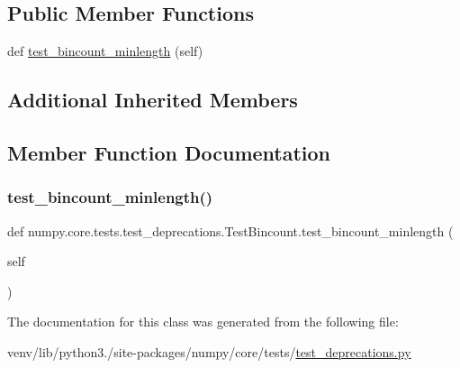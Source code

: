 \subsection*{Public Member Functions}
\begin{DoxyCompactItemize}
\item 
def \hyperlink{classnumpy_1_1core_1_1tests_1_1test__deprecations_1_1TestBincount_a8cfee9588e6784ca48a94bbd00c7c5a6}{test\+\_\+bincount\+\_\+minlength} (self)
\end{DoxyCompactItemize}
\subsection*{Additional Inherited Members}


\subsection{Member Function Documentation}
\mbox{\label{classnumpy_1_1core_1_1tests_1_1test__deprecations_1_1TestBincount_a8cfee9588e6784ca48a94bbd00c7c5a6}} 
\subsubsection{\texorpdfstring{test\+\_\+bincount\+\_\+minlength()}{test\_bincount\_minlength()}}
{\footnotesize\ttfamily def numpy.\+core.\+tests.\+test\+\_\+deprecations.\+Test\+Bincount.\+test\+\_\+bincount\+\_\+minlength (\begin{DoxyParamCaption}\item[{}]{self }\end{DoxyParamCaption})}



The documentation for this class was generated from the following file\+:\begin{DoxyCompactItemize}
\item 
venv/lib/python3./site-\/packages/numpy/core/tests/\hyperlink{core_2tests_2test__deprecations_8py}{test\+\_\+deprecations.\+py}\end{DoxyCompactItemize}
